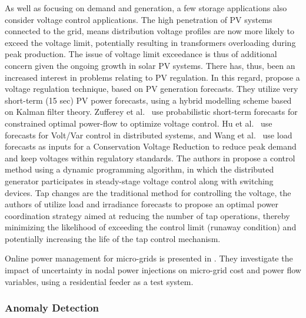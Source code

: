 As well as focusing on demand and generation, a few storage applications also consider voltage control applications. The high penetration of PV systems connected to the grid, means distribution voltage profiles are now more likely to exceed the voltage limit, potentially resulting in transformers overloading during peak production. The issue of voltage limit exceedance is thus of additional concern given the ongoing growth in solar PV systems. There has, thus, been an increased interest in problems relating to PV regulation. In this regard, \cite{Ghosh2017dvr} propose a voltage regulation technique, based on PV generation forecasts. They utilize very short-term (15 sec) PV power forecasts, using a hybrid modelling scheme based on Kalman filter theory.
Zufferey et al.~\cite{zufferey2020psf} use probabilistic short-term forecasts for constrained optimal power-flow to optimize voltage control. Hu et al.~\cite{hu2003vvc} use forecasts for Volt/Var control in distributed systems, and Wang et al.~\cite{wang2013acv} use load forecasts as inputs for a Conservation Voltage Reduction to reduce peak demand and keep voltages within regulatory standards. The authors in \cite{Kim2013ccd} propose a control method using a dynamic programming algorithm, in which the distributed generator participates in steady-stage voltage control along with switching devices. Tap changes are the traditional method for controlling the voltage, the authors of \cite{Agalgaonkar2014dvc} utilize load and irradiance forecasts to propose an optimal power coordination strategy aimed at reducing the number of tap operations, thereby minimizing the likelihood of exceeding the control limit (runaway condition) and potentially increasing the life of the tap control mechanism.

Online power management for micro-grids is presented in \cite{Mohan2016snf}. They investigate the impact of uncertainty in nodal power injections on micro-grid cost and power flow variables, using a residential feeder as a test system.

\subsubsection{Anomaly Detection}

